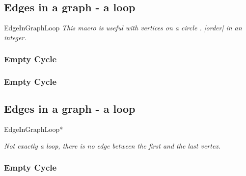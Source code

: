 \vfill
\newpage
\subsection{Edges in a graph - a loop }%
\begin{NewMacroBox}{EdgeInGraphLoop}{}
\emph{This macro is useful with vertices on a circle . |order| in an integer.}
\end{NewMacroBox} 


\subsubsection{Empty Cycle}
\begin{center}
  \begin{tkzexample}
  \end{tkzexample}
\end{center}

\subsubsection{Empty Cycle}
\begin{center}
\begin{tkzexample}
\end{tkzexample}
\end{center}

\newpage
\subsection{Edges in a graph - a loop }
\begin{NewMacroBox}{EdgeInGraphLoop*}{}

\medskip
\emph{Not exactly a loop, there is no edge between the first and the last vertex.}
\end{NewMacroBox}

\subsubsection{Empty Cycle}
\begin{center}
\begin{tkzexample}
\end{tkzexample}
\end{center}

